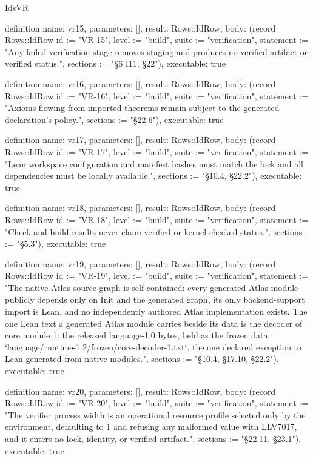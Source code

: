 \begin{lexlean}{IdsVR}
\begin{semanticmodule}
definition{
  name: vr15,
  parameters: [],
  result: Rows::IdRow,
  body: (record Rows::IdRow {id := "VR-15", level := "build", suite := "verification", statement := "Any failed verification stage removes staging and produces no verified artifact or verified status.", sections := "§6 I11, §22"}),
  executable: true
}

definition{
  name: vr16,
  parameters: [],
  result: Rows::IdRow,
  body: (record Rows::IdRow {id := "VR-16", level := "build", suite := "verification", statement := "Axioms flowing from imported theorems remain subject to the generated declaration's policy.", sections := "§22.6"}),
  executable: true
}

definition{
  name: vr17,
  parameters: [],
  result: Rows::IdRow,
  body: (record Rows::IdRow {id := "VR-17", level := "build", suite := "verification", statement := "Lean workspace configuration and manifest hashes must match the lock and all dependencies must be locally available.", sections := "§10.4, §22.2"}),
  executable: true
}

definition{
  name: vr18,
  parameters: [],
  result: Rows::IdRow,
  body: (record Rows::IdRow {id := "VR-18", level := "build", suite := "verification", statement := "Check and build results never claim verified or kernel-checked status.", sections := "§5.3"}),
  executable: true
}

definition{
  name: vr19,
  parameters: [],
  result: Rows::IdRow,
  body: (record Rows::IdRow {id := "VR-19", level := "build", suite := "verification", statement := "The native Atlas source graph is self-contained: every generated Atlas module publicly depends only on Init and the generated graph, its only backend-support import is Lean, and no independently authored Atlas implementation exists. The one Lean text a generated Atlas module carries beside its data is the decoder of core module 1: the released language-1.0 bytes, held as the frozen data `language/runtime-1.2/frozen/core-decoder-1.txt`, the one declared exception to Lean generated from native modules.", sections := "§10.4, §17.10, §22.2"}),
  executable: true
}

definition{
  name: vr20,
  parameters: [],
  result: Rows::IdRow,
  body: (record Rows::IdRow {id := "VR-20", level := "build", suite := "verification", statement := "The verifier process width is an operational resource profile selected only by the environment, defaulting to 1 and refusing any malformed value with LLV7017, and it enters no lock, identity, or verified artifact.", sections := "§22.11, §23.1"}),
  executable: true
}


\end{semanticmodule}
\end{lexlean}
